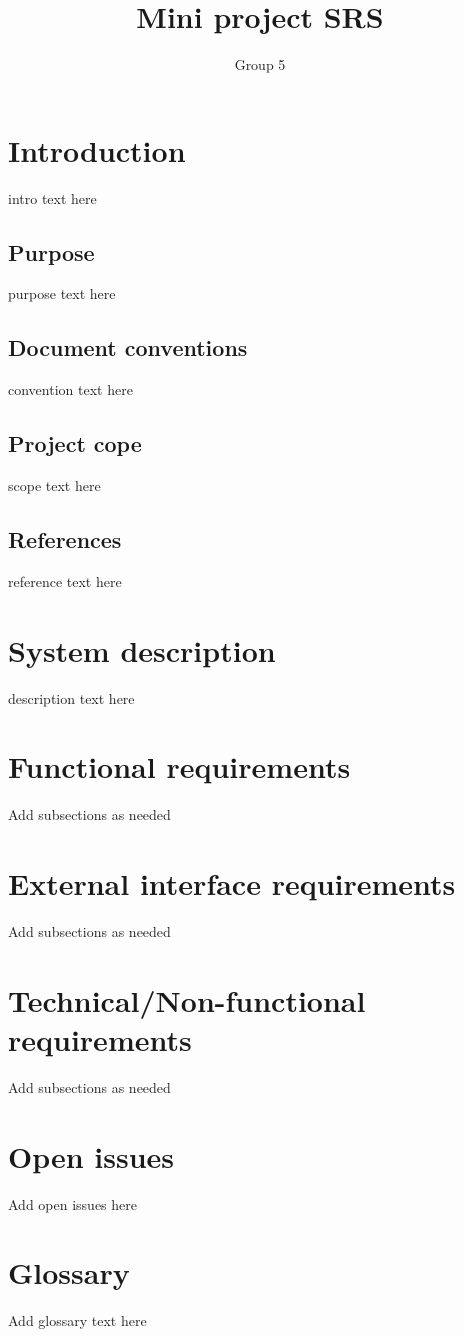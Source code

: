 \documentclass[10pt,a4paper]{article}
\author{Group 5}
\title{Mini project SRS}
\begin{document}
\section{Introduction}
intro text here
\subsection{Purpose}
purpose text here
\subsection{Document conventions}
convention text here
\subsection{Project cope}
scope text here
\subsection{References}
reference text here
\section{System description}
description text here
\section{Functional requirements}
Add subsections as needed
\section{External interface requirements}
Add subsections as needed
\section{Technical/Non-functional requirements}
Add subsections as needed
\section{Open issues}
Add open issues here
\section{Glossary}
Add glossary text here
\end{document}
